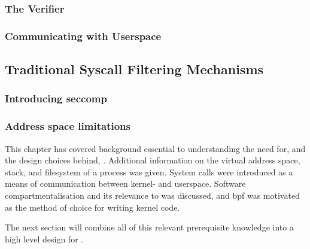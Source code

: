 \subsubsection{The Verifier}

\subsubsection{Communicating with Userspace}

\subsection{Traditional Syscall Filtering Mechanisms}

\subsubsection{Introducing seccomp}

\subsubsection{Address space limitations}



This chapter has covered background essential to understanding the need for, and
the design choices behind, \afss. Additional information on the
virtual address space, stack, and filesystem of a process was given. System
calls were introduced as a means of communication between kernel- and userspace.
Software compartmentalisation and its relevance to \af was
discussed, and \ac{bpf} was motivated as the method of choice for writing kernel
code. 

The next section will combine all of this relevant prerequisite knowledge into a
high level design for \afss. 
